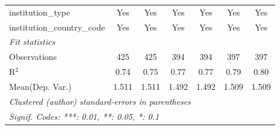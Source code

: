 \begin{tabular}{lcccccc}
   institution\_type                  & Yes     & Yes     & Yes     & Yes     & Yes     & Yes\\  
   institution\_country\_code         & Yes     & Yes     & Yes     & Yes     & Yes     & Yes\\  
   \midrule
   \emph{Fit statistics}\\
   Observations                       & 425     & 425     & 394     & 394     & 397     & 397\\  
   R$^2$                              & 0.74    & 0.75    & 0.77    & 0.77    & 0.79    & 0.80\\  
Mean(Dep. Var.) & 1.511 & 1.511 & 1.492 & 1.492 & 1.509 & 1.509 \\
   \midrule \midrule
   \multicolumn{7}{l}{\emph{Clustered (author) standard-errors in parentheses}}\\
   \multicolumn{7}{l}{\emph{Signif. Codes: ***: 0.01, **: 0.05, *: 0.1}}\\
\end{tabular}
\par\endgroup
